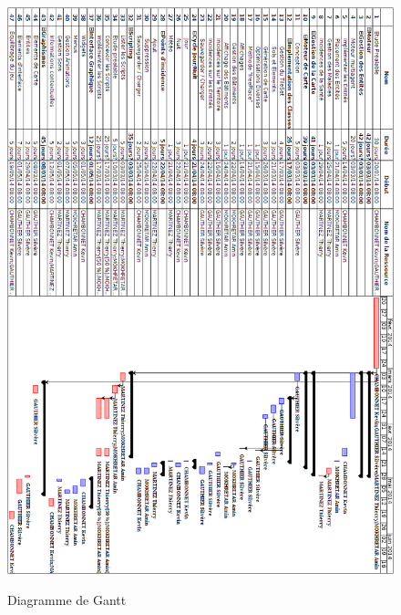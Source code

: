 \documentclass[a4paper]{memoir}
\begin{document}
		\section*{}
			\begin{figure}
				\vspace{-3,5cm} \hspace{-4,5cm} \includegraphics[scale=0.6]{img/Gantt.png}
				\label{fig:gantt}
				\vspace{-0,5cm} \caption{Diagramme de Gantt}
			\end{figure}
			
\end{document}
